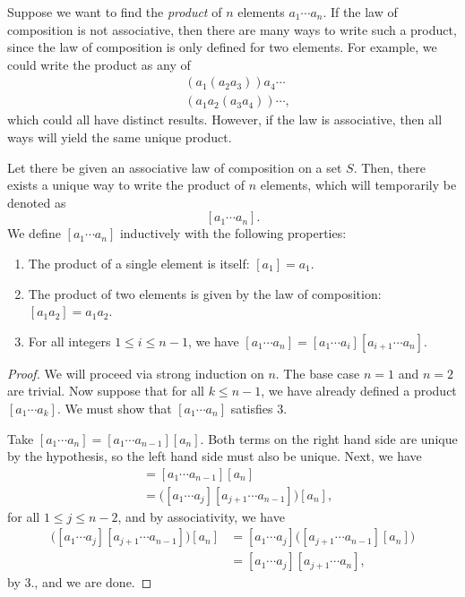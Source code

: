 Suppose we want to find the \emph{product} of $n$ elements $a_1 \cdots a_n$. If the law of composition is not associative, then there are many ways to write such a product, since the law of composition is only defined for two elements. For example, we could write the product as any of
\begin{align*}
  &(a_1(a_2a_3))a_4\cdots \\
  &(a_1a_2(a_3a_4))\cdots,
\end{align*}
which could all have distinct results. However, if the law is associative, then all ways will yield the same unique product.
\begin{proposition}
  Let there be given an associative law of composition on a set $S$. Then, there exists a unique way to write the product of $n$ elements, which will temporarily be denoted as \[
    [a_1 \cdots a_n].
  \] 
  We define $[a_1 \cdots a_n]$ inductively with the following properties:
  \begin{enumerate}
    \item The product of a single element is itself: $[a_1] = a_1$.
    \item The product of two elements is given by the law of composition: $[a_1a_2] = a_1a_2$.
    \item For all integers $1 \le i \le n-1$, we have $[a_1\cdots a_n] = [a_1 \cdots a_i][a_{i+1} \cdots a_n]$.
  \end{enumerate}
\end{proposition}
\begin{proof}
  We will proceed via strong induction on $n$. The base case $n = 1$ and $n = 2$ are trivial. Now suppose that for all $k \le n-1$, we have already defined a product $[a_1 \cdots a_k]$. We must show that $[a_1 \cdots a_n]$ satisfies 3.

  Take $[a_1 \cdots a_n] = [a_1 \cdots a_{n-1}][a_n]$. Both terms on the right hand side are unique by the hypothesis, so the left hand side must also be unique. Next, we have 
  \begin{align*}
    [a_1 \cdots a_n] &= [a_1 \cdots a_{n-1}][a_n] \\
                     &= \big([a_1 \cdots a_{j}][a_{j+1}\cdots a_{n-1}]\big)[a_n],
  \end{align*}
  for all $1 \le j \le n-2$, and by associativity, we have 
  \begin{align*}
    \big([a_1 \cdots a_{j}][a_{j+1}\cdots a_{n-1}]\big)[a_n] &= [a_1 \cdots a_j]\big([a_{j+1}\cdots a_{n-1}][a_n]\big) \\
                                                             &= [a_1 \cdots a_j][a_{j+1} \cdots a_n],
  \end{align*}
  by 3., and we are done.
\end{proof}

